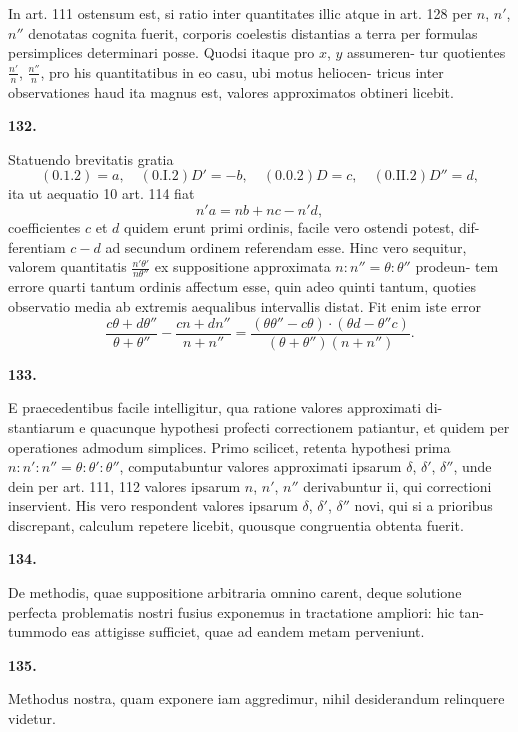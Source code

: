 \documentclass[12pt,a4paper]{article}
\begin{document}
In art. 111 ostensum est, si ratio inter quantitates illic atque in art. 128
per $n$, $n'$, $n''$ denotatas cognita fuerit, corporis coelestis distantias a terra per
formulas persimplices determinari posse. Quodsi itaque pro $x$, $y$ assumeren-
tur quotientes $\frac{n'}{n}$, $\frac{n''}{n}$, pro his quantitatibus in eo casu, ubi motus heliocen-
tricus inter observationes haud ita magnus est, valores approximatos obtineri
licebit.

\bigskip
\noindent\textbf{132.}

Statuendo brevitatis gratia
\[
(0.1.2) = a, \quad (0.\text{I}.2)D' = -b, \quad (0.0.2)D = c, \quad (0.\text{II}.2)D'' = d,
\]
ita ut aequatio 10 art. 114 fiat
\[
n'a = nb + nc - n'd,
\]
coefficientes $c$ et $d$ quidem erunt primi ordinis, facile vero ostendi potest, dif-
ferentiam $c - d$ ad secundum ordinem referendam esse. Hinc vero sequitur,
valorem quantitatis $\frac{n'\theta'}{n\theta''}$ ex suppositione approximata $n:n'' = \theta:\theta''$ prodeun-
tem errore quarti tantum ordinis affectum esse, quin adeo quinti tantum, quoties
observatio media ab extremis aequalibus intervallis distat. Fit enim iste error
\[
\frac{c\theta + d\theta''}{\theta + \theta''} - \frac{cn + dn''}{n + n''} = \frac{(\theta\theta'' - c\theta)\cdot (\theta d - \theta''c)}{(\theta + \theta'')(n + n'')}.
\]

\bigskip
\noindent\textbf{133.}

E praecedentibus facile intelligitur, qua ratione valores approximati di-
stantiarum e quacunque hypothesi profecti correctionem patiantur, et quidem
per operationes admodum simplices. Primo scilicet, retenta hypothesi prima
$n:n':n'' = \theta:\theta':\theta''$, computabuntur valores approximati ipsarum
$\delta$, $\delta'$, $\delta''$, unde dein per art. 111, 112 valores ipsarum $n$, $n'$, $n''$ derivabuntur
ii, qui correctioni inservient. His vero respondent valores ipsarum $\delta$, $\delta'$,
$\delta''$ novi, qui si a prioribus discrepant, calculum repetere licebit, quousque
congruentia obtenta fuerit.

\bigskip
\noindent\textbf{134.}

De methodis, quae suppositione arbitraria omnino carent, deque solutione
perfecta problematis nostri fusius exponemus in tractatione ampliori: hic tan-
tummodo eas attigisse sufficiet, quae ad eandem metam perveniunt.

\bigskip
\noindent\textbf{135.}

Methodus nostra, quam exponere iam aggredimur, nihil desiderandum
relinquere videtur.
\end{document}
